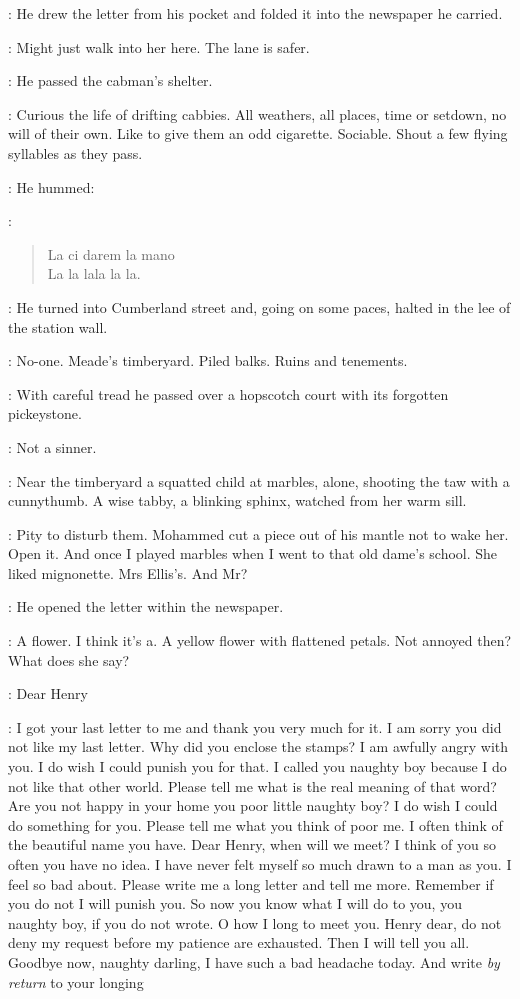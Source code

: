 :
He drew the letter from his pocket
and folded it into the newspaper he carried.

\BloomInt:
Might just walk into her here.
The lane is safer.

:
He passed the cabman's shelter.

\BloomInt:
Curious the life of drifting cabbies.
All weathers, all places,
time or setdown,
no will of their own.
Like to give them an odd cigarette.
Sociable.
Shout a few flying syllables as they pass.

:
He hummed:

\BloomInt:
\begin{verse}
    La ci darem la mano \\
    La la lala la la.
\end{verse}

:
He turned into Cumberland street
and, going on some paces,
halted in the lee of the station wall.

\BloomInt:
No-one.
Meade's timberyard.
Piled balks.
Ruins and tenements.

:
With careful tread
he passed over a hopscotch court with its forgotten pickeystone.

\BloomInt:
Not a sinner.

:
Near the timberyard a squatted child at marbles,
alone,
shooting the taw with a cunnythumb.
A wise tabby, a blinking sphinx,
watched from her warm sill.

\BloomInt:
Pity to disturb them.
Mohammed cut a piece out of his mantle not to wake her.
Open it.
And once I played marbles when I went to that old dame's school.
She liked mignonette.
Mrs Ellis's.
And Mr?

:
He opened the letter within the newspaper.

\BloomInt:
A flower.
I think it's a.
A yellow flower with flattened petals.
Not annoyed then?
What does she say?

\martha:
Dear Henry

\martha:
I got your last letter to me and thank you very much for it.
I am sorry you did not like my last letter.
Why did you enclose the stamps?
I am awfully angry with you.
I do wish I could punish you for that.
I called you naughty boy
because I do not like that other world.
Please tell me what is the real meaning of that word?
Are you not happy in your home
you poor little naughty boy?
I do wish I could do something for you.
Please tell me what you think of poor me.
I often think of the beautiful name you have.
Dear Henry,
when will we meet?
I think of you so often
you have no idea.
I have never felt myself so much drawn to a man as you.
I feel so bad about.
Please write me a long letter and tell me more.
Remember if you do not
I will punish you.
So now you know what I will do to you,
you naughty boy, if you do not wrote.
O how I long to meet you.
Henry dear, do not deny my request before my patience are exhausted.
Then I will tell you all.
Goodbye now, naughty darling,
I have such a bad headache today.
And write \emph{by return} to your longing

